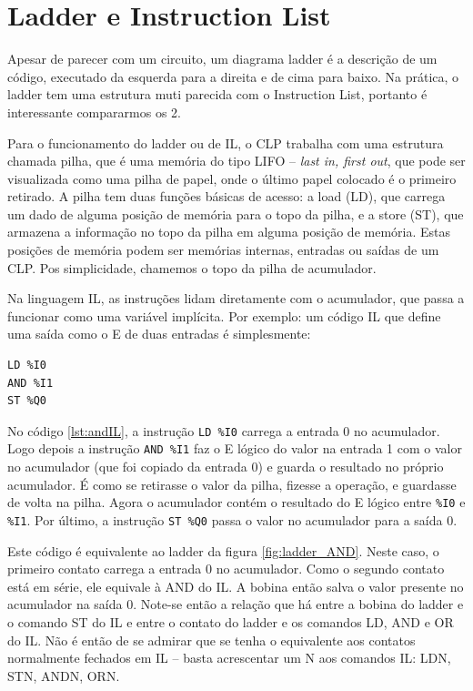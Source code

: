 \section{Ladder e Instruction List}

Apesar de parecer com um circuito, um diagrama ladder é a descrição de um código, executado da esquerda para a direita e de cima para baixo. Na prática, o ladder tem uma estrutura muti parecida com o Instruction List, portanto é interessante compararmos os 2.

Para o funcionamento do ladder ou de IL, o CLP trabalha com uma estrutura chamada pilha, que é uma memória do tipo LIFO -- \emph{last in, first out}, que pode ser visualizada como uma pilha de papel, onde o último papel colocado é o primeiro retirado. A pilha tem duas funções básicas de acesso: a load (LD), que carrega um dado de alguma posição de memória para o topo da pilha, e a store (ST), que armazena a informação no topo da pilha em alguma posição de memória. Estas posições de memória podem ser memórias internas, entradas ou saídas de um CLP. Pos simplicidade, chamemos o topo da pilha de acumulador.

Na linguagem IL, as instruções lidam diretamente com o acumulador, que passa a funcionar como uma variável implícita. Por exemplo: um código IL que define uma saída como o E de duas entradas é simplesmente:
\begin{lstlisting}[caption=Código IL de um E lógico, label=lst:andIL]
LD %I0
AND %I1
ST %Q0
\end{lstlisting}

No código \ref{lst:andIL}, a instrução \lstinline|LD %I0| carrega a entrada 0 no acumulador. Logo depois a instrução \lstinline|AND %I1| faz o E lógico do valor na entrada 1 com o valor no acumulador (que foi copiado da entrada 0) e guarda o resultado no próprio acumulador. É como se retirasse o valor da pilha, fizesse a operação, e guardasse de volta na pilha. Agora o acumulador contém o resultado do E lógico entre \lstinline|%I0| e \lstinline|%I1|. Por último, a instrução \lstinline|ST %Q0| passa o valor no acumulador para a saída 0.

Este código é equivalente ao ladder da figura \ref{fig:ladder_AND}. Neste caso, o primeiro contato carrega a entrada 0 no acumulador. Como o segundo contato está em série, ele equivale à AND do IL. A bobina então salva o valor presente no acumulador na saída 0. Note-se então a relação que há entre a bobina do ladder e o comando ST do IL e entre o contato do ladder e os comandos LD, AND e OR do IL. Não é então de se admirar que se tenha o equivalente aos contatos normalmente fechados em IL -- basta acrescentar um N aos comandos IL: LDN, STN, ANDN, ORN.

